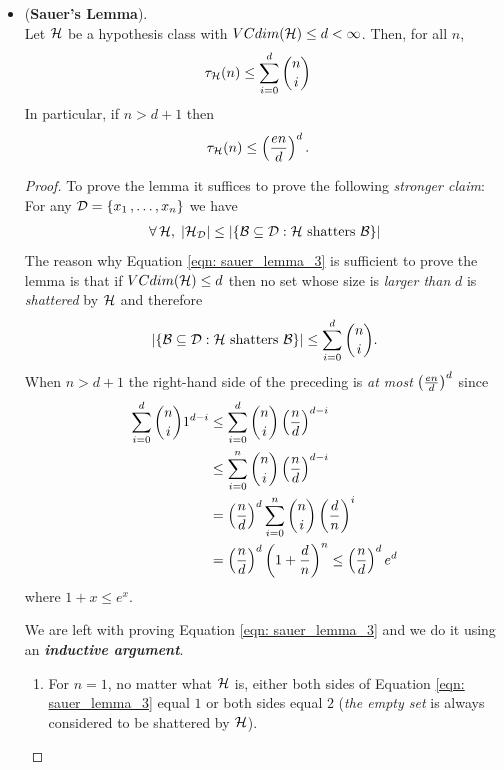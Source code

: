 \documentclass[11pt]{article}
\begin{document}
\begin{itemize}
\item \begin{lemma} (\textbf{Sauer's Lemma}). \citep{shalev2014understanding, mohri2018foundations}\\
Let ${\mathcal H}$ be a hypothesis class with $VCdim({\mathcal H}) \le d < \infty$. Then, for all $n$, 
\begin{align}
\tau_{{\mathcal H}}(n) &\le \sum_{i=0}^{d}{{n}\choose{i}} \label{eqn: sauer_lemma_1}
\end{align}
In particular, if $n > d + 1$ then
\begin{align}
\tau_{{\mathcal H}}(n) &\le \left(\frac{en}{d}\right)^{d}. \label{eqn: sauer_lemma_2}
\end{align}
\end{lemma}
\begin{proof}
To prove the lemma it suffices to prove the following \emph{stronger claim}: For any ${\mathcal D} = \left\{x_1 \,{,}\ldots{,}\, x_n\right\}$ we have
\begin{align}
\forall\, {\mathcal H}, \; \left\lvert {\mathcal H}_{{\mathcal D}} \right\rvert \le  \left\lvert \left\{{\mathcal B} \subseteq {\mathcal D}: {\mathcal H}\text{ shatters }{\mathcal B}\right\} \right\rvert\label{eqn: sauer_lemma_3}
\end{align} The reason why Equation \eqref{eqn: sauer_lemma_3} is sufficient to prove the lemma is that if
$VCdim({\mathcal H}) \le d$ then no set whose size is \emph{larger than} $d$ is \emph{shattered} by ${\mathcal H}$ and therefore
\begin{align*}
\left\lvert \left\{{\mathcal B} \subseteq {\mathcal D}: {\mathcal H}\text{ shatters }{\mathcal B}\right\} \right\rvert \le  \sum_{i=0}^{d}{{n}\choose{i}}.
\end{align*}
When $n > d + 1$ the right-hand side of the preceding is \emph{at most} $\left(\frac{en}{d}\right)^{d}$ since
\begin{align*}
 \sum_{i=0}^{d}{{n}\choose{i}}1^{d- i} &\le  \sum_{i=0}^{d}{{n}\choose{i}}\left(\frac{n}{d}\right)^{d - i}\\
 &\le  \sum_{i=0}^{n}{{n}\choose{i}}\left(\frac{n}{d}\right)^{d - i} \\
 &= \left(\frac{n}{d}\right)^{d} \sum_{i=0}^{n}{{n}\choose{i}}\left(\frac{d}{n}\right)^{i} \\
 &= \left(\frac{n}{d}\right)^{d}\left(1 + \frac{d}{n}\right)^n \le \left(\frac{n}{d}\right)^{d}e^{d}
\end{align*} where $1+x \le e^x$.



We are left with proving Equation \eqref{eqn: sauer_lemma_3} and we do it using an \emph{\textbf{inductive argument}}. 
\begin{enumerate}
\item For $n = 1$, no matter what ${\mathcal H}$ is, either both sides of Equation \eqref{eqn: sauer_lemma_3} equal $1$ or both sides equal $2$ (\emph{the empty set} is always considered to be shattered by ${\mathcal H}$).


\end{enumerate}
\end{proof}
\end{itemize}
\end{document}
